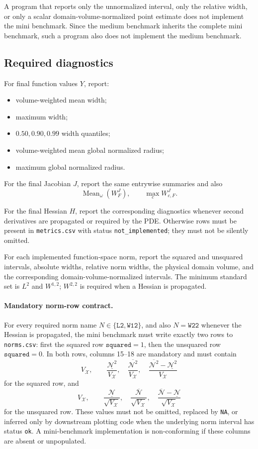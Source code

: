 \documentclass[11pt]{article}
\newcommand{\Mean}{\operatorname{Mean}}
\begin{document}
A program that reports only the unnormalized interval, only the relative width,
or only a scalar domain-volume-normalized point estimate does not implement the
mini benchmark.  Since the medium benchmark inherits the complete mini
benchmark, such a program also does not implement the medium benchmark.


\subsection{Required diagnostics}

For final function values \(Y\), report:
\begin{itemize}
 \item volume-weighted mean width;
 \item maximum width;
 \item \(0.50,0.90,0.99\) width quantiles;
 \item volume-weighted mean global normalized radius;
 \item maximum global normalized radius.
\end{itemize}

For the final Jacobian \(J\), report the same entrywise summaries and also
\[
 \Mean_\omega(W_F^J),\qquad \max_c W_{c,F}^J.
\]

For the final Hessian \(H\), report the corresponding diagnostics whenever
second derivatives are propagated or required by the PDE.  Otherwise rows must
be present in \texttt{metrics.csv} with status \texttt{not\_implemented}; they
must not be silently omitted.

For each implemented function-space norm, report the squared and unsquared
intervals, absolute widths, relative norm widths, the physical domain volume,
and the corresponding domain-volume-normalized intervals.  The minimum
standard set is \(L^2\) and \(W^{1,2}\); \(W^{2,2}\) is required when a
Hessian is propagated.

\paragraph{Mandatory norm-row contract.}
For every required norm name \(N\in\{\texttt{L2},\texttt{W12}\}\), and
also \(N=\texttt{W22}\) whenever the Hessian is propagated, the mini
benchmark must write exactly two rows to \texttt{norms.csv}: first the squared
row \(\texttt{squared}=1\), then the unsquared row
\(\texttt{squared}=0\).  In both rows, columns 15--18 are mandatory and
must contain
\[
 V_{\mathcal X},\qquad
 \frac{\underline{\mathcal N^2}}{V_{\mathcal X}},\quad
 \frac{\overline{\mathcal N^2}}{V_{\mathcal X}},\quad
 \frac{\overline{\mathcal N^2}-\underline{\mathcal N^2}}
      {V_{\mathcal X}}
\]
for the squared row, and
\[
 V_{\mathcal X},\qquad
 \frac{\underline{\mathcal N}}{\sqrt{V_{\mathcal X}}},\quad
 \frac{\overline{\mathcal N}}{\sqrt{V_{\mathcal X}}},\quad
 \frac{\overline{\mathcal N}-\underline{\mathcal N}}
      {\sqrt{V_{\mathcal X}}}
\]
for the unsquared row.  These values must not be omitted, replaced by
\texttt{NA}, or inferred only by downstream plotting code when the underlying
norm interval has status \texttt{ok}.  A mini-benchmark implementation is
non-conforming if these columns are absent or unpopulated.
\end{document}
